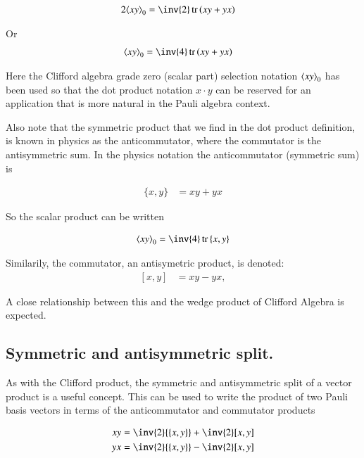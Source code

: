 \documentclass{article}
\DeclareMathOperator{\tr}{tr}
\newcommand{\trace}[1]{\tr{#1}}
\newcommand{\traceB}[1]{\tr\left({#1}\right)}
\newcommand{\symmetric}[2]{{\{{#1},{#2}\}}}
\newcommand{\antisymmetric}[2]{[{#1},{#2}]}
\begin{document}
\begin{align*}
2 \gpgradezero{x y} &= \inv{2}\traceB{x y + y x}
\end{align*}

Or
\begin{align}
\gpgradezero{x y} &= \inv{4}\traceB{x y + y x}
\end{align}

Here the Clifford algebra grade zero (scalar part) selection notation ${\left\langle{{x y}}\right\rangle}_{0}$ has been used so that the dot product notation $x \cdot y$ can be reserved for an application that is more natural in the Pauli algebra context.

Also note that the symmetric product that we find in the dot product definition, is known in physics as the anticommutator, where the commutator
is the antisymmetric sum.  In the physics notation the anticommutator (symmetric sum) is

\begin{align}\label{eqn:anticommutator}
\symmetric{x}{y} &= x y + y x
\end{align}

So the scalar product can be written

\begin{align}
\gpgradezero{ x y } = \inv{4}\trace{\symmetric{x}{y}}
\end{align}

Similarily, the commutator, an antisymetric product, is denoted:
\begin{align}\label{eqn:commutator}
\antisymmetric{x}{y} &= x y - y x,
\end{align}

A close relationship between this and the wedge product of Clifford Algebra is
expected.

\subsection{ Symmetric and antisymmetric split. }

As with the Clifford product, the symmetric and antisymmetric split of a vector
product is a useful concept.  This can be used to write the product 
of two Pauli basis vectors in terms of the anticommutator and commutator 
products

\begin{align}
x y &= \inv{2} \symmetric{x}{y} + \inv{2} \antisymmetric{x}{y} \\
y x &= \inv{2} \symmetric{x}{y} - \inv{2} \antisymmetric{x}{y}
\end{align}
\end{document}
